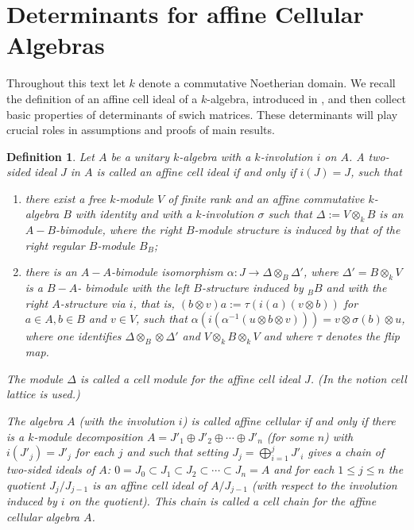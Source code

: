 \documentclass[oneside, a4paper, 11pt]{amsart}
\newtheorem{definition}[theorem]{Definition }
\begin{document}
\section{Determinants for affine Cellular Algebras}
Throughout this text let $k$ denote a commutative Noetherian domain. We recall
the definition of an affine cell ideal of a $k$-algebra, introduced in
\cite{KXaffine}, and then collect basic properties of determinants of
swich matrices. These determinants will play crucial roles in assumptions and
proofs of main results.
\begin{definition} Let $A$ be a unitary $k$-algebra with a $k$-involution $i$ on $A$. A two-sided ideal $J$ in $A$ is called an \emph{affine cell ideal} if and only if $i(J)=J$, such that 
\begin{enumerate}
\item there exist a free $k$-module $V$ of finite rank and an affine commutative $k$-algebra $B$ with identity and with a $k$-involution $\sigma$ such that $\Delta := V \otimes_k B$ is an $A-B$-bimodule, where the right $B$-module structure is induced by that of the right regular $B$-module $B_B$;
\item there is an $A-A$-bimodule isomorphism $\alpha: J \to \Delta \otimes_B \Delta'$, where $\Delta' = B \otimes_k V$ is a $B-A$-
bimodule with the left $B$-structure induced by $_BB$ and with the right $A$-structure via $i$, that is, $(b \otimes v) a := \tau (i(a)(v \otimes b))$ for $a\in A, b\in B$ and $v\in V$, such that 
$\alpha(i(\alpha^{-1}( u \otimes b \otimes v))) = v \otimes \sigma(b) \otimes u$, where one identifies $\Delta\otimes_B\otimes \Delta'$ and $V\otimes_k B \otimes_k V$ and where $\tau$ denotes the flip map.
\end{enumerate}
The module $\Delta$ is called a \emph{cell module} for the affine cell ideal $J$. (In \cite{KXaffine} the notion \emph{cell lattice} is used.) 

The algebra $A$ (with the involution $i$) is called \emph{affine cellular} if and only if there is a $k$-module decomposition 
$A = J'_1 \oplus J'_2 \oplus \cdots \oplus J'_n$ (for some $n$) with $i(J'_j) = J'_j$ for each $j$ and such that setting 
$J_j = \bigoplus_{i=1}^j J'_i$ gives a chain of two-sided ideals of $A$: $0 = J_0 \subset J_1 \subset J_2 \subset \cdots \subset J_n = A$  and for each $1\leq j\leq n$ the quotient $J_j/J_{j-1}$ is an affine cell ideal of $A/J_{j-1}$ (with respect to the involution induced by $i$ on the quotient). This chain is called a \emph{cell chain} for the affine cellular algebra $A$.
\end{definition}
\end{document}
